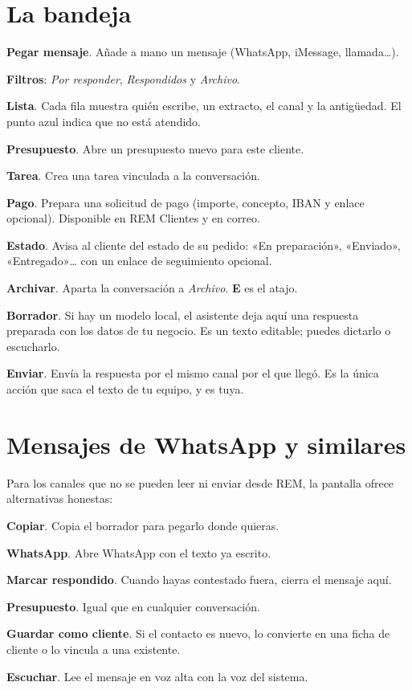 \section{La bandeja}
\begin{leyenda}
\item[\mk{1}] \textbf{Pegar mensaje}. Añade a mano un mensaje (WhatsApp, iMessage, llamada…).
\item[\mk{2}] \textbf{Filtros}: \emph{Por responder}, \emph{Respondidos} y \emph{Archivo}.
\item[\mk{3}] \textbf{Lista}. Cada fila muestra quién escribe, un extracto, el canal y la antigüedad. El punto azul indica que no está atendido.
\item[\mk{4}] \textbf{Presupuesto}. Abre un presupuesto nuevo para este cliente.
\item[\mk{5}] \textbf{Tarea}. Crea una tarea vinculada a la conversación.
\item[\mk{6}] \textbf{Pago}. Prepara una solicitud de pago (importe, concepto, IBAN y enlace opcional). Disponible en REM Clientes y en correo.
\item[\mk{7}] \textbf{Estado}. Avisa al cliente del estado de su pedido: «En preparación», «Enviado», «Entregado»… con un enlace de seguimiento opcional.
\item[\mk{8}] \textbf{Archivar}. Aparta la conversación a \emph{Archivo}. \textbf{E} es el atajo.
\item[\mk{9}] \textbf{Borrador}. Si hay un modelo local, el asistente deja aquí una respuesta preparada con los datos de tu negocio. Es un texto editable; puedes dictarlo o escucharlo.
\item[\mk{10}] \textbf{Enviar}. Envía la respuesta por el mismo canal por el que llegó. Es la única acción que saca el texto de tu equipo, y es tuya.
\end{leyenda}

\section{Mensajes de WhatsApp y similares}
Para los canales que no se pueden leer ni enviar desde REM, la pantalla ofrece alternativas honestas:
\begin{leyenda}
\item[\mk{1}] \textbf{Copiar}. Copia el borrador para pegarlo donde quieras.
\item[\mk{2}] \textbf{WhatsApp}. Abre WhatsApp con el texto ya escrito.
\item[\mk{3}] \textbf{Marcar respondido}. Cuando hayas contestado fuera, cierra el mensaje aquí.
\item[\mk{4}] \textbf{Presupuesto}. Igual que en cualquier conversación.
\item[\mk{5}] \textbf{Guardar como cliente}. Si el contacto es nuevo, lo convierte en una ficha de cliente o lo vincula a una existente.
\item[\mk{6}] \textbf{Escuchar}. Lee el mensaje en voz alta con la voz del sistema.
\end{leyenda}

